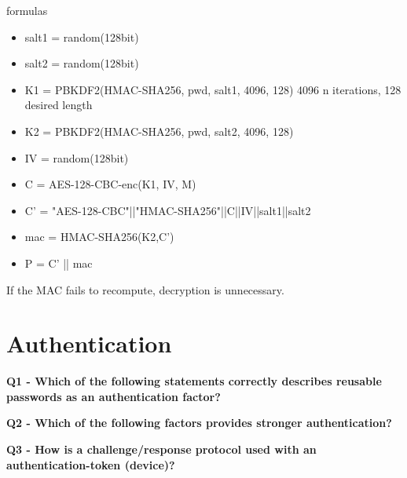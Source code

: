 formulas
\begin{itemize}
    \item salt1 = random(128bit)
    \item salt2 = random(128bit)
    \item K1 = PBKDF2(HMAC-SHA256, pwd, salt1, 4096, 128) \textcolor{Comment}{4096 n iterations, 128 desired length}
    \item K2 = PBKDF2(HMAC-SHA256, pwd, salt2, 4096, 128)
    \item IV = random(128bit)
    \item C = AES-128-CBC-enc(K1, IV, M)
    \item C' = "AES-128-CBC"||"HMAC-SHA256"||C||IV||salt1||salt2
    \item mac = HMAC-SHA256(K2,C')
    \item P = C' || mac
\end{itemize}
\textcolor{Comment}{If the MAC fails to recompute, decryption is unnecessary.}


\section*{Authentication}
\textbf{Q1 - Which of the following statements correctly describes reusable passwords as an authentication factor?}

\textbf{Q2 - Which of the following factors provides stronger authentication?}

\textbf{Q3 - How is a challenge/response protocol used with an authentication-token (device)?}

